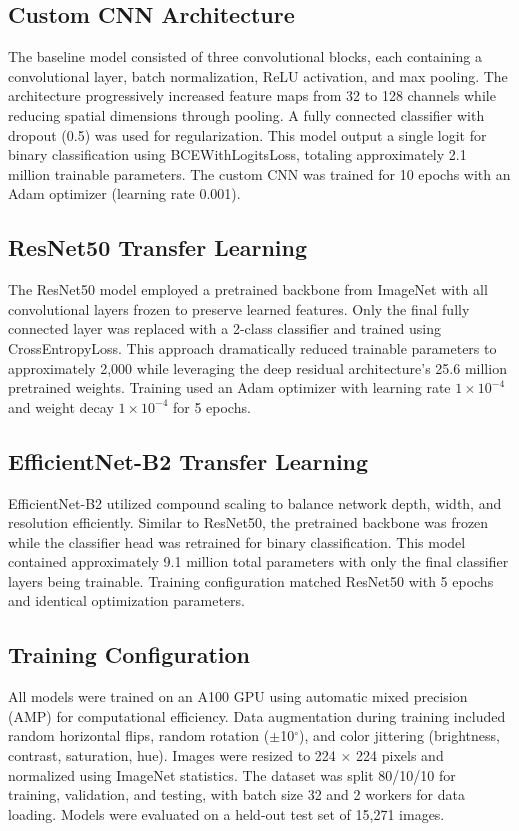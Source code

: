 \documentclass[man,12pt,letterpaper,donotrepeattitle,floatsintext]{apa7}
\begin{document}
\subsection{Custom CNN Architecture}
The baseline model consisted of three convolutional blocks, each containing a convolutional 
layer, batch normalization, ReLU activation, and max pooling. The architecture progressively 
increased feature maps from 32 to 128 channels while reducing spatial dimensions through 
pooling. A fully connected classifier with dropout (0.5) was used for regularization. 
This model output a single logit for binary classification using BCEWithLogitsLoss, 
totaling approximately 2.1 million trainable parameters. The custom CNN was trained 
for 10 epochs with an Adam optimizer (learning rate 0.001).

\subsection{ResNet50 Transfer Learning}
The ResNet50 model employed a pretrained backbone from ImageNet with all convolutional 
layers frozen to preserve learned features. Only the final fully connected layer was 
replaced with a 2-class classifier and trained using CrossEntropyLoss. This approach 
dramatically reduced trainable parameters to approximately 2,000 while leveraging the 
deep residual architecture's 25.6 million pretrained weights. Training used an Adam 
optimizer with learning rate $1 \times 10^{-4}$ and weight decay $1 \times 10^{-4}$ 
for 5 epochs.

\subsection{EfficientNet-B2 Transfer Learning}
EfficientNet-B2 utilized compound scaling to balance network depth, width, and resolution 
efficiently. Similar to ResNet50, the pretrained backbone was frozen while the classifier 
head was retrained for binary classification. This model contained approximately 9.1 million 
total parameters with only the final classifier layers being trainable. Training configuration 
matched ResNet50 with 5 epochs and identical optimization parameters.

\subsection{Training Configuration}
All models were trained on an A100 GPU using automatic mixed precision (AMP) for computational 
efficiency. Data augmentation during training included random horizontal flips, random rotation 
($\pm$10$^\circ$), and color jittering (brightness, contrast, saturation, hue). Images were resized to 
224 $\times$ 224 pixels and normalized using ImageNet statistics. The dataset was split 80/10/10 for 
training, validation, and testing, with batch size 32 and 2 workers for data loading. 
Models were evaluated on a held-out test set of 15,271 images.
\end{document}
